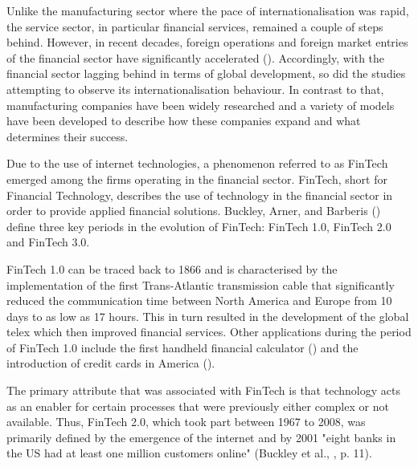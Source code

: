 \documentclass[11pt,a4paper]{article}
\begin{document}
\frenchspacing
{}\par
Unlike the manufacturing sector where the pace of internationalisation was rapid, the service sector, in particular financial services, remained a couple of steps behind. However, in recent decades, foreign operations and foreign market entries of the financial sector have significantly accelerated (\cite{hannounInternationalisationFinancialServices2006}). Accordingly, with the financial sector lagging behind in terms of global development, so did the studies attempting to observe its internationalisation behaviour. In contrast to that, manufacturing companies have been widely researched and a variety of models \parencite{dunningEclecticTheoryInternational1980, dunningEclecticParadigmEnvelope2000, johansonInternationalizationProcessFirm1977,  rennieGlobalCompetitivenessBorn1993} have been developed to describe how these companies expand and what determines their success. \par
Due to the use of internet technologies, a phenomenon referred to as FinTech emerged among the firms operating in the financial sector. FinTech, short for Financial Technology, describes the use of technology in the financial sector in order to provide applied financial solutions. Buckley, Arner, and Barberis (\citeyear{buckleyEvolutionFintechNew2016}) define three key periods in the evolution of FinTech: FinTech 1.0, FinTech 2.0 and FinTech 3.0.\par
FinTech 1.0 can be traced back to 1866 and is characterised by the implementation of the first Trans-Atlantic transmission cable that significantly reduced the communication time between North America and Europe from 10 days to as low as 17 hours. This in turn resulted in the development of the global telex which then improved financial services. Other applications during the period of FinTech 1.0 include the first handheld financial calculator (\cite{thibodeauTIFirstHandheld2007}) and the introduction of credit cards in America (\cite{markhamFinancialHistoryUnited2015}). \par
The primary attribute that was associated with FinTech is that technology acts as an enabler for certain processes that were previously either complex or not available. Thus, FinTech 2.0, which took part between 1967 to 2008, was primarily defined by the emergence of the internet and by 2001 "eight banks in the US had at least one million customers online"  (Buckley et al., \citeyear{buckleyEvolutionFintechNew2016}, p. 11). \par 
\end{document}
